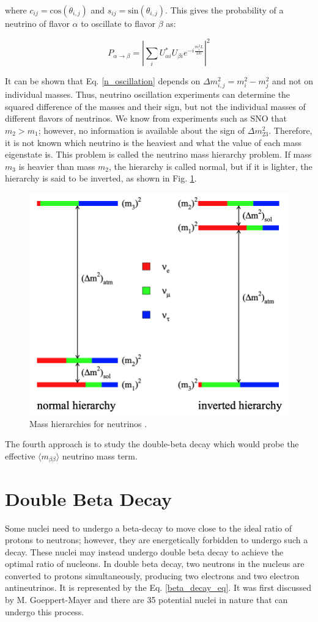 where $c_{ij}=\mathrm{cos}(\theta_{i,j})$ and $s_{ij}=\mathrm{sin}(\theta_{i,j})$. This gives the probability of a neutrino of flavor $\alpha$ to oscillate to flavor $\beta$ as:

\begin{equation}\label{n_oscillation}
P_{\alpha\rightarrow\beta} = \left|\sum_i U^*_{\alpha i}U_{\beta i} e^{-i\frac{m_i^2L}{2E}}\right|^2
\end{equation}

It can be shown that Eq. \ref{n_oscillation} depends on $\Delta m^2_{i,j}=m^2_i-m^2_j$ and not on individual masses. Thus, neutrino oscillation experiments can determine the squared difference of the masses and their sign, but not the individual masses of different flavors of neutrinos. We know from experiments such as SNO that $m_2>m_1$; however, no information is available about the sign of $\Delta m_{23}^2$. Therefore, it is not known which neutrino is the heaviest and what the value of each mass eigenstate is. This problem is called the neutrino mass hierarchy problem. If mass $m_3$ is heavier than mass $m_2$, the hierarchy is called normal, but if it is lighter, the hierarchy is said to be inverted, as shown in Fig. \ref{mass_hierarchies_fig}.

\begin{figure}%
\centering
\includegraphics[width=0.7\linewidth]{ch1/figs/mass_hierarchies.png}
\caption{Mass hierarchies for neutrinos \cite{Hewett:2012ns}.}
\label{mass_hierarchies_fig}
\end{figure}

The fourth approach is to study the double-beta decay which would probe the effective $\langle m_{\beta\beta}\rangle$ neutrino mass term.

\section{Double Beta Decay}
Some nuclei need to undergo a beta-decay to move close to the ideal ratio of protons to neutrons; however, they are energetically forbidden to undergo such a decay. These nuclei may instead undergo double beta decay to achieve the optimal ratio of nucleons. In double beta decay, two neutrons in the nucleus are converted to protons simultaneously, producing two electrons and two electron antineutrinos. It is represented by the Eq. \ref{beta_decay_eq}. It was first discussed by M. Goeppert-Mayer and there are 35 potential nuclei in nature that can undergo this process\cite{ZUBER_2012}.

